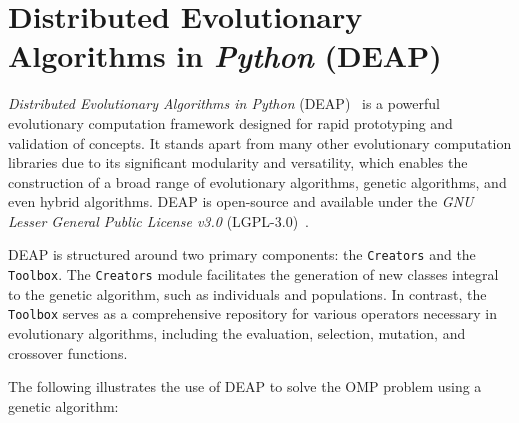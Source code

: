 
\section{Distributed Evolutionary Algorithms in \textit{Python} (DEAP)}
\label{sec:sota:deap}
  \emph{Distributed Evolutionary Algorithms in Python} 
  (DEAP)~\autocite{DEAPDocumentationDEAP} is a powerful evolutionary computation
  framework designed for rapid prototyping and validation of concepts.
  It stands apart from many other evolutionary computation libraries due to its
  significant modularity and versatility, which enables the construction of a
  broad range of evolutionary algorithms, genetic algorithms, and even hybrid
  algorithms.
  DEAP is open-source and available under the \textit{GNU Lesser General Public
  License v3.0} (LGPL-3.0)~\autocite{GNULesserGeneral}.

  DEAP is structured around two primary components: the \texttt{Creators} and
  the \texttt{Toolbox}.
  The \texttt{Creators} module facilitates the generation of new classes
  integral to the genetic algorithm, such as individuals and populations.
  In contrast, the \texttt{Toolbox} serves as a comprehensive repository for
  various operators necessary in evolutionary algorithms, including the
  evaluation, selection, mutation, and crossover functions.

  The following illustrates the use of DEAP to solve the OMP problem using a
  genetic algorithm:

